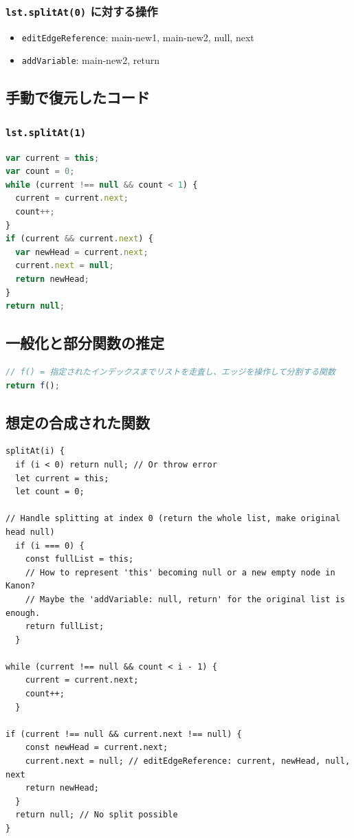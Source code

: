 \documentclass{article}
\begin{document}
\subsubsection{\texttt{lst.splitAt(0)} に対する操作}
\begin{itemize}
  \item \texttt{editEdgeReference}: main-new1, main-new2, null, next
  \item \texttt{addVariable}: main-new2, return
\end{itemize}

\subsection{手動で復元したコード}

\subsubsection{\texttt{lst.splitAt(1)}}
\begin{lstlisting}[language=JavaScript]
var current = this;
var count = 0;
while (current !== null && count < 1) {
  current = current.next;
  count++;
}
if (current && current.next) {
  var newHead = current.next;
  current.next = null;
  return newHead;
}
return null;
\end{lstlisting}

\subsection{一般化と部分関数の推定}

\begin{lstlisting}[language=JavaScript]
// f() = 指定されたインデックスまでリストを走査し、エッジを操作して分割する関数
return f();
\end{lstlisting}

\subsection{想定の合成された関数}
\begin{lstlisting}
splitAt(i) {
  if (i < 0) return null; // Or throw error
  let current = this;
  let count = 0;

// Handle splitting at index 0 (return the whole list, make original head null)
  if (i === 0) {
    const fullList = this;
    // How to represent 'this' becoming null or a new empty node in Kanon?
    // Maybe the 'addVariable: null, return' for the original list is enough.
    return fullList;
  }

while (current !== null && count < i - 1) {
    current = current.next;
    count++;
  }

if (current !== null && current.next !== null) {
    const newHead = current.next;
    current.next = null; // editEdgeReference: current, newHead, null, next
    return newHead;
  }
  return null; // No split possible
}
\end{lstlisting}
\end{document}
